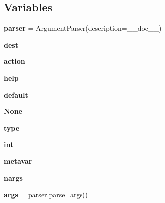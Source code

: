 \subsection*{Variables}
\begin{DoxyCompactItemize}
\item 
\mbox{\label{namespacepymavlink_1_1tools_1_1mavextract_aee740166d1f1332d9c6333466f8a6ce2}} 
{\bfseries parser} = Argument\+Parser(description=\+\_\+\+\_\+doc\+\_\+\+\_\+)
\item 
\mbox{\label{namespacepymavlink_1_1tools_1_1mavextract_a7debd290a3cf9d7a5d4ca70b6bf96fcb}} 
{\bfseries dest}
\item 
\mbox{\label{namespacepymavlink_1_1tools_1_1mavextract_a012de8ef8cc089ea7b1b706cc12a05bb}} 
{\bfseries action}
\item 
\mbox{\label{namespacepymavlink_1_1tools_1_1mavextract_a7e54a401d0f11779e41a75e213f53e73}} 
{\bfseries help}
\item 
\mbox{\label{namespacepymavlink_1_1tools_1_1mavextract_adad293b4792f724f913423b1006abd31}} 
{\bfseries default}
\item 
\mbox{\label{namespacepymavlink_1_1tools_1_1mavextract_a6a1ded8ef70ec3ca3bc88057baa38fa7}} 
{\bfseries None}
\item 
\mbox{\label{namespacepymavlink_1_1tools_1_1mavextract_a66a2ee63fed8b11066152eb667c63220}} 
{\bfseries type}
\item 
\mbox{\label{namespacepymavlink_1_1tools_1_1mavextract_a04f63779e7ab2e172c3752d6ab4e7328}} 
{\bfseries int}
\item 
\mbox{\label{namespacepymavlink_1_1tools_1_1mavextract_ac94675b920c6754633d0e410d5f54410}} 
{\bfseries metavar}
\item 
\mbox{\label{namespacepymavlink_1_1tools_1_1mavextract_ab5566ab9c047002961c9af079d040310}} 
{\bfseries nargs}
\item 
\mbox{\label{namespacepymavlink_1_1tools_1_1mavextract_ac5b60c4a676c910e635ddd1c77293899}} 
{\bfseries args} = parser.\+parse\+\_\+args()
\end{DoxyCompactItemize}


